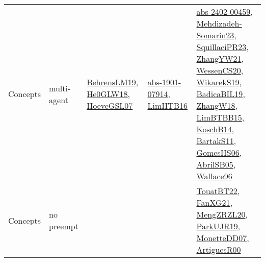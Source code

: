 {\begin{longtable}{lp{3cm}>{\raggedright}p{6cm}>{\raggedright}p{6cm}p{8cm}}
Concepts & multi-agent & \href{papers/BehrensLM19.pdf}{BehrensLM19}\cite{BehrensLM19}, \href{papers/He0GLW18.pdf}{He0GLW18}\cite{He0GLW18}, \href{papers/HoeveGSL07.pdf}{HoeveGSL07}\cite{HoeveGSL07} & \href{articles/abs-1901-07914.pdf}{abs-1901-07914}\cite{abs-1901-07914}, \href{papers/LimHTB16.pdf}{LimHTB16}\cite{LimHTB16} & \href{articles/abs-2402-00459.pdf}{abs-2402-00459}\cite{abs-2402-00459}, \href{papers/Mehdizadeh-Somarin23.pdf}{Mehdizadeh-Somarin23}\cite{Mehdizadeh-Somarin23}, \href{papers/SquillaciPR23.pdf}{SquillaciPR23}\cite{SquillaciPR23}, \href{articles/ZhangYW21.pdf}{ZhangYW21}\cite{ZhangYW21}, \href{papers/WessenCS20.pdf}{WessenCS20}\cite{WessenCS20}, \href{articles/WikarekS19.pdf}{WikarekS19}\cite{WikarekS19}, \href{papers/BadicaBIL19.pdf}{BadicaBIL19}\cite{BadicaBIL19}, \href{articles/ZhangW18.pdf}{ZhangW18}\cite{ZhangW18}, \href{papers/LimBTBB15.pdf}{LimBTBB15}\cite{LimBTBB15}, \href{papers/KoschB14.pdf}{KoschB14}\cite{KoschB14}, \href{articles/BartakS11.pdf}{BartakS11}\cite{BartakS11}, \href{papers/GomesHS06.pdf}{GomesHS06}\cite{GomesHS06}, \href{papers/AbrilSB05.pdf}{AbrilSB05}\cite{AbrilSB05}, \href{articles/Wallace96.pdf}{Wallace96}\cite{Wallace96}\\
Concepts & no preempt &  &  & \href{papers/TouatBT22.pdf}{TouatBT22}\cite{TouatBT22}, \href{articles/FanXG21.pdf}{FanXG21}\cite{FanXG21}, \href{articles/MengZRZL20.pdf}{MengZRZL20}\cite{MengZRZL20}, \href{papers/ParkUJR19.pdf}{ParkUJR19}\cite{ParkUJR19}, \href{papers/MonetteDD07.pdf}{MonetteDD07}\cite{MonetteDD07}, \href{articles/ArtiguesR00.pdf}{ArtiguesR00}\cite{ArtiguesR00}\\

\end{longtable}}
